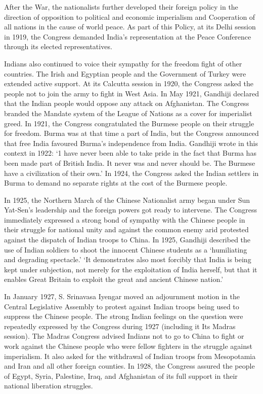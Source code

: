 After the War, the nationalists further developed their foreign policy in the direction of opposition to political and economic imperialism and Cooperation of all nations in the cause of world peace. As part of this Policy, at its Delhi session in 1919, the Congress demanded India's representation at the Peace Conference through its elected representatives. 

Indians also continued to voice their sympathy for the freedom fight of other countries. The Irish and Egyptian people and the Government of Turkey were extended active support. At its Calcutta session in 1920, the Congress asked the people not to join the army to fight in West Asia. In May 1921, Gandhiji declared that the Indian people would oppose any attack on Afghanistan. The Congress branded the Mandate system of the League of Nations as a cover for imperialist greed. In 1921, the Congress congratulated the Burmese people on their struggle for freedom. Burma was at that time a part of India, but the Congress announced that free India favoured Burma's independence from India. Gandhiji wrote in this context in 1922: `1 have never been able to take pride in the fact that Burma has been made part of British India. It never was and never should be. The Burmese have a civilization of their own.' In 1924, the Congress asked the Indian settlers in Burma to demand no separate rights at the cost of the Burmese people. 

In 1925, the Northern March of the Chinese Nationalist army began under Sun Yat-Sen's leadership and the foreign powers got ready to intervene. The Congress immediately expressed a strong bond of sympathy with the Chinese people in their struggle for national unity and against the common enemy arid protested against the dispatch of Indian troops to China. In 1925, Gandhiji described the use of Indian soldiers to shoot the innocent Chinese students as a `humiliating and degrading spectacle.' `It demonstrates also most forcibly that India is being kept under subjection, not merely for the exploitation of India herself, but that it enables Great Britain to exploit the great and ancient Chinese nation.' 

In January 1927, S. Srinavasa Iyengar moved an adjournment motion in the Central Legislative Assembly to protest against Indian troops being used to suppress the Chinese people. The strong Indian feelings on the question were repeatedly expressed by the Congress during 1927 (including it Its Madras session). The Madras Congress advised Indians not to go to China to fight or work against the Chinese people who were fellow fighters in the struggle against imperialism. It also asked for the withdrawal of Indian troops from Mesopotamia and Iran and all other foreign counties. In 1928, the Congress assured the people of Egypt, Syria, Palestine, Iraq, and Afghanistan of its full support in their national liberation struggles. 

